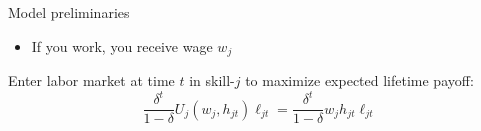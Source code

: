 \begin{frame}{Model preliminaries}
\begin{itemize}
    
    \item If you work, you receive wage $w_j$
\end{itemize}


\vspace{2ex}
Enter labor market at time $t$ in skill-$j$ to maximize expected lifetime payoff:
\begin{equation*}
    \frac{\delta^t}{1 - \delta} U_j (w_{j}, h_{jt}) \ell_{jt}
    = \frac{\delta^t}{1 - \delta} w_{j} h_{jt} \ell_{jt}
\end{equation*}


\end{frame}

